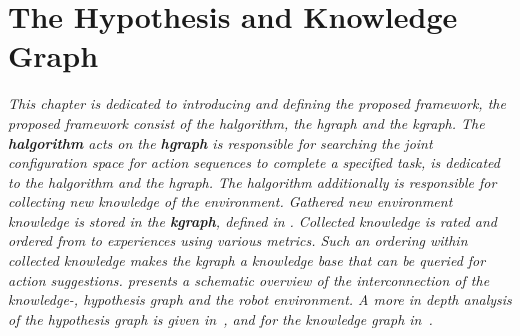 \chapter{The Hypothesis and Knowledge Graph}%
\label{chap:hgraph_and_kgraph}

\textit{This chapter is dedicated to introducing and defining the proposed framework, the proposed framework consist of the \acl{halgorithm}, the \acl{hgraph} and the \acl{kgraph}. The \textbf{\acl{halgorithm}} acts on the \textbf{\acl{hgraph}} is responsible for searching the joint configuration space for action sequences to complete a specified task,  is dedicated to the \ac{halgorithm} and the \ac{hgraph}. The \ac{halgorithm} additionally is responsible for collecting new knowledge of the environment. Gathered new environment knowledge is stored in the \textbf{\acl{kgraph}}, defined in . Collected knowledge is rated and ordered from  to  experiences using various metrics. Such an ordering within collected knowledge makes the \ac{kgraph} a knowledge base that can be queried for action suggestions.  presents a schematic overview of the interconnection of the knowledge-, hypothesis graph and the robot environment. A more in depth analysis of the hypothesis graph is given in~, and for the knowledge graph in~.}

